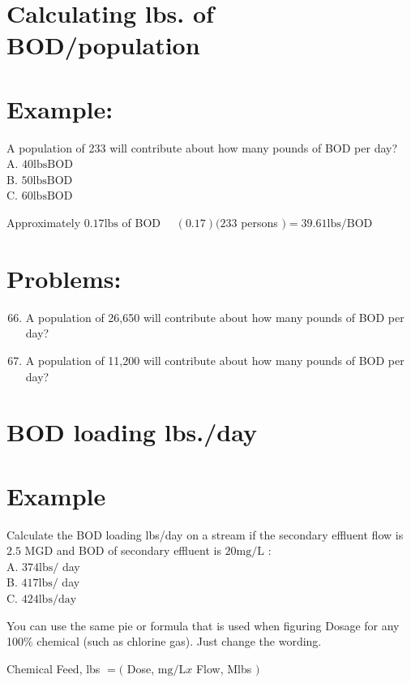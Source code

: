 \begin{enumerate}
\begin{enumerate}
\end{enumerate}
\section{Calculating lbs. of BOD/population}
\section{Example:}
A population of 233 will contribute about how many pounds of BOD per day?\\
A. $40 \mathrm{lbs} \mathrm{BOD}$\\
B. $50 \mathrm{lbs} \mathrm{BOD}$\\
C. $60 \mathrm{lbs} \mathrm{BOD}$

Approximately $0.17 \mathrm{lbs}$ of BOD $\quad(0.17)(233$ persons $)=39.61 \mathrm{lbs} / \mathrm{BOD}$

\section{Problems:}
\begin{enumerate}
  \setcounter{enumi}{65}
  \item A population of 26,650 will contribute about how many pounds of BOD per day?

  \item A population of 11,200 will contribute about how many pounds of BOD per day?

\end{enumerate}
\section{BOD loading lbs./day}
\section{Example}
Calculate the BOD loading lbs/day on a stream if the secondary effluent flow is $2.5$ MGD and BOD of secondary effluent is $20 \mathrm{mg} / \mathrm{L}$ :\\
A. $374 \mathrm{lbs} /$ day\\
B. $417 \mathrm{lbs} /$ day\\
C. $424 \mathrm{lbs} / \mathrm{day}$

You can use the same pie or formula that is used when figuring Dosage for any 100\% chemical (such as chlorine gas). Just change the wording.

Chemical Feed, lbs $=($ Dose, $\mathrm{mg} / \mathrm{L} x$ Flow, Mlbs $)$


\end{enumerate}
